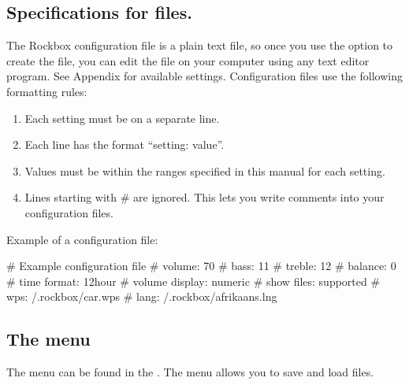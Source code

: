 \subsection{\label{ref:cfg_specs}Specifications for 
  files.}

The Rockbox configuration file is a plain text file, so once you use the 
 option to create the file, you can edit the file on 
your computer using any text editor program. See 
Appendix  for available settings. Configuration 
files use the following formatting rules: %

\begin{enumerate} 
\item Each setting must be on a separate line. 
\item Each line has the format ``setting: value''. 
\item Values must be within the ranges specified in this manual for each 
  setting. 
\item Lines starting with \# are ignored. This lets you write comments into 
  your configuration files. 
\end{enumerate}

Example of a configuration file:
\begin{example}
  # Example configuration file
  # volume: 70
  # bass: 11
  # treble: 12
  # balance: 0
  # time format: 12hour
  # volume display: numeric
  # show files: supported
  # wps: /.rockbox/car.wps
  # lang: /.rockbox/afrikaans.lng
\end{example}


\subsection{\label{ref:manage_settings_menu}The  
  menu} The  menu can be found in the .  The  menu allows you to save and load 
 files.   

